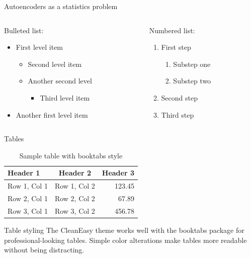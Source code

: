 \documentclass[aspectratio=169,xcolor=dvipsnames]{beamer}
\begin{document}
\begin{frame}{Autoencoders as a statistics problem}
  \begin{columns}
    \begin{column}{0.48\textwidth}
      Bulleted list:
      \begin{itemize}
        \item First level item
        \begin{itemize}
          \item Second level item
          \item Another second level
          \begin{itemize}
            \item Third level item
          \end{itemize}
        \end{itemize}
        \item Another first level item
      \end{itemize}
    \end{column}
    \begin{column}{0.48\textwidth}
      Numbered list:
      \begin{enumerate}
        \item First step
        \begin{enumerate}
          \item Substep one
          \item Substep two
        \end{enumerate}
        \item Second step
        \item Third step
      \end{enumerate}
    \end{column}
  \end{columns}
\end{frame}

\begin{frame}{Tables}
  \begin{table}
    \centering
    \caption{Sample table with booktabs style}
    \begin{tabular}{lcr}
      \toprule
      \textbf{Header 1} & \textbf{Header 2} & \textbf{Header 3} \\
      \midrule
      Row 1, Col 1 & Row 1, Col 2 & 123.45 \\
      Row 2, Col 1 & Row 2, Col 2 & 67.89 \\
      Row 3, Col 1 & Row 3, Col 2 & 456.78 \\
      \bottomrule
    \end{tabular}
  \end{table}
  
  \vspace{0.5cm}
  
  \begin{block}{Table styling}
    The CleanEasy theme works well with the booktabs package for professional-looking tables. 
    Simple color alterations make tables more readable without being distracting.
  \end{block}
\end{frame}
\end{document}
